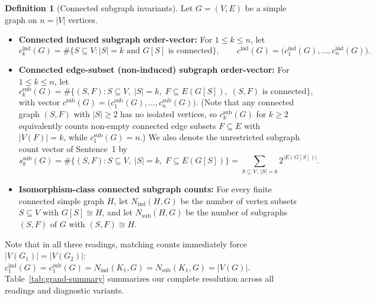 \documentclass[11pt]{article}
\theoremstyle{definition}
\newtheorem{definition}[theorem]{Definition}
\newcommand{\cind}{c^{\mathrm{ind}}}
\newcommand{\csub}{c^{\mathrm{sub}}}
\newcommand{\ssub}{s^{\mathrm{sub}}}
\newcommand{\Nind}{N_{\mathrm{ind}}}
\newcommand{\Nsub}{N_{\mathrm{sub}}}
\begin{document}
\begin{definition}[Connected subgraph invariants]
Let $G = (V, E)$ be a simple graph on $n = |V|$ vertices.
\begin{itemize}
  \item[(I)] \textbf{Connected induced subgraph order-vector:} For $1 \le k \le n$, let
  \[
    \cind_k(G) = \#\bigl\{S \subseteq V : |S| = k \text{ and } G[S] \text{ is connected}\bigr\},
    \qquad \cind(G) = \bigl(\cind_1(G), \dots, \cind_n(G)\bigr).
  \]
  \item[(II)] \textbf{Connected edge-subset (non-induced) subgraph order-vector:} For $1 \le k \le n$, let
  \[
    \csub_k(G) = \#\bigl\{(S, F) : S \subseteq V,\; |S| = k,\; F \subseteq E(G[S]),\; (S, F) \text{ is connected}\bigr\},
  \]
  with vector $\csub(G) = \bigl(\csub_1(G), \dots, \csub_n(G)\bigr)$. (Note that any connected graph $(S, F)$ with $|S| \ge 2$ has no isolated vertices, so $\csub_k(G)$ for $k \ge 2$ equivalently counts non-empty connected edge subsets $F \subseteq E$ with $|V(F)| = k$, while $\csub_1(G) = n$.) We also denote the unrestricted subgraph count vector of Sentence~1 by
  \[
    \ssub_k(G) = \#\bigl\{(S, F) : S \subseteq V,\; |S| = k,\; F \subseteq E(G[S])\bigr\}
    = \sum_{S \subseteq V,\, |S| = k} 2^{|E(G[S])|}.
  \]
  \item[(III)] \textbf{Isomorphism-class connected subgraph counts:} For every finite connected simple graph $H$, let $\Nind(H, G)$ be the number of vertex subsets $S \subseteq V$ with $G[S] \cong H$, and let $\Nsub(H, G)$ be the number of subgraphs $(S, F)$ of $G$ with $(S, F) \cong H$.
\end{itemize}
\end{definition}

Note that in all three readings, matching counts immediately force $|V(G_1)| = |V(G_2)|$: $\cind_1(G) = \csub_1(G) = \Nind(K_1, G) = \Nsub(K_1, G) = |V(G)|$. Table~\ref{tab:grand-summary} summarizes our complete resolution across all readings and diagnostic variants.
\end{document}
